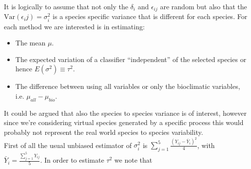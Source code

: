 It is logically to assume that not only the $\delta_i$ and $\epsilon_{ij}$ are random but also that the $\text{Var}(\epsilon_ij) = \sigma_i^2$ is a species specific variance that is different for each species. For each method we are interested is in estimating:
\begin{itemize}
\item The mean $\mu$.
\item The expected variation of a classifier ``independent'' of the selected species or hence $E(\sigma^2) \equiv \tau^2$.
\item The difference between using all variables or only the bioclimatic variables, i.e. $\mu_{all} - \mu_{bio}$.
\end{itemize} 
It could be argued that also the species to species variance is of interest, however since we're considering virtual species generated by a specific process this would probably not represent the real world species to species variability. \\

First of all the usual unbiased estimator of $\sigma_i^2$ is $\sum_{j= 1}^{5} \frac{(Y_{ij} - \bar{Y}_i)^2}{4} $, with $\bar{Y}_i = \frac{\sum_{j=1}^{5}Y_{ij}}{5}$.
In order to estimate $\tau^2$ we note that 

